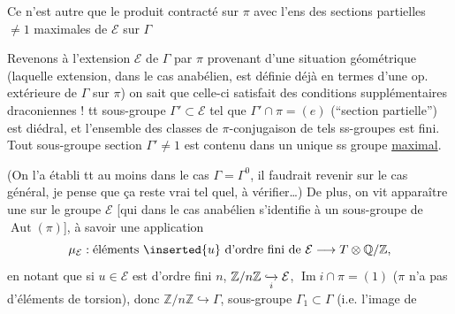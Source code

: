 Ce  n'est autre que le produit contracté sur
\(\pi\) avec l'ens des sections partielles \(\ne1\) maximales de
\(\mathcal E\) sur \(\Gamma\)



Revenons à l'extension \(\mathcal E\) de \(\Gamma\) par \(\pi\)
provenant d'une situation géométrique
(laquelle extension, dans le cas anabélien, est définie déjà en termes
d'une op. extérieure de \(\Gamma\) sur \(\pi\))
on sait que celle-ci satisfait des conditions supplémentaires
draconiennes !
tt sous-groupe \(\Gamma'\subset\mathcal E\) tel que
\(\Gamma'\cap\pi=(e)\) (``section partielle'') est
 diédral,
et l'ensemble des classes de \(\pi\)-conjugaison de tels ss-groupes
est fini.
Tout sous-groupe section \(\Gamma'\ne1\) est contenu dans un unique
ss groupe  \uline{maximal}.

(On l'a établi tt au moins dans le cas
\(\Gamma=\Gamma^0\), il faudrait revenir sur le cas général,
je pense que ça reste vrai tel quel, à vérifier\ldots)
De plus, on vit apparaître une 
sur le groupe \(\mathcal E\)
[qui dans le cas anabélien s'identifie à un sous-groupe de
\(\operatorname{Aut}(\pi)\)], à savoir une application
\[
\mu_{\mathcal E}:
\text{éléments }\inserted{u}\text{ d'ordre fini de }\mathcal E
\longrightarrow T\otimes\mathbb Q/\mathbb Z,
\]
 en notant que si \(u\in\mathcal E\) est d'ordre fini
\(n\),  \(\mathbb Z/n\mathbb Z\lhook\joinrel\xrightarrow[i]{}
\mathcal E\),  \(\operatorname{Im}i\cap\pi=(1)\)
(\(\pi\) n'a pas d'éléments de torsion), donc
\(\mathbb Z/n\mathbb Z\hookrightarrow\Gamma\),  sous-groupe
\(\Gamma_1\subset\Gamma\) (i.e. l'image de

